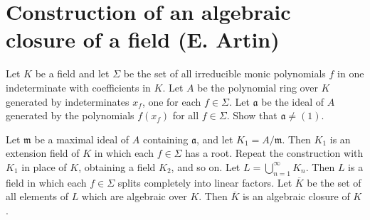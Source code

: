 \section*{Construction of an algebraic closure of a field (E. Artin)}



\begin{exercise}
\label{ex:1.13}
Let $K$ be a field and let $\Sigma$ be the set of all irreducible monic polynomials $f$ in one indeterminate with coefficients in $K$.
Let $A$ be the polynomial ring over $K$ generated by indeterminates $x_f$, one for each $f \in \Sigma$.
Let $\mathfrak a$ be the ideal of $A$ generated by the polynomials  $f(x_f)$ for all $f\in \Sigma$.
Show that $\mathfrak a \neq (1)$.

Let $\mathfrak m$ be a maximal ideal of $A$ containing $\mathfrak a$, and let $K_1 = A/\mathfrak m$.
Then $K_1$ is an extension field of $K$ in which each $f \in \Sigma$ has a root.
Repeat the construction with $K_1$ in place of $K$, obtaining a field $K_2$, and so on.
Let $L = \bigcup_{n=1}^\infty K_n$.
Then $L$ is a field in which each $f \in \Sigma$ splits completely into linear factors.
Let $\overline K$ be the set of all elements of $L$ which are algebraic over $K$.
Then $\overline K$ is an algebraic closure of $K$.
\end{exercise}

